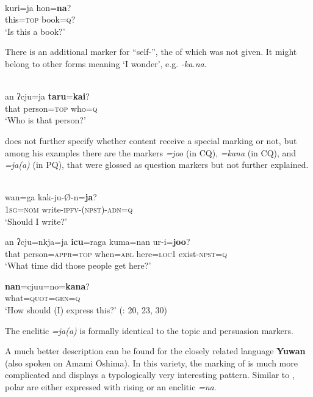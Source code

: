 \ea%
    \label{ex:japa:15}
    \\
    \gll kuri=ja  hon=\textbf{{na}}?\\
    this=\textsc{top}  book=\textsc{q}?\\
    \glt ‘Is this a book?’ \citep[27]{Shigeno2010}
    \z

There is an additional marker for “self-”, the  of which was not given. It might belong to other forms meaning ‘I wonder’, e.g.  \textit{-ka.na}.

\ea%
    \label{ex:japa:16}
    \\
    \gll an  ʔcju=ja \textbf{{taru}}{=}\textbf{{kai}}?\\
    that  person=\textsc{top}  who=\textsc{q}\\
    \glt ‘Who is that person?’ \citep[27]{Shigeno2010}
    \z

\citet{Shigeno2010} does not further specify whether content  receive a special marking or not, but among his examples there are the markers \textit{=joo} (in CQ), \textit{=kana} (in CQ), and \textit{=ja(a)} (in PQ), that were glossed as question markers but not further explained.

\ea%
    \label{ex:japa:17}
    \\
    \ea
    \gll wan=ga kak-ju-Ø-n=\textbf{{ja}}?\\
    1\textsc{sg}=\textsc{nom}  write-\textsc{ipfv}-(\textsc{npst})-\textsc{adn}=\textsc{q}\\
    \glt ‘Should I write?’
    
    \ex
    \gll an ʔcju=nkja=ja \textbf{{icu}}{=raga} kuma=nan ur-i=\textbf{{joo}}?\\
    that  person=\textsc{appr}=\textsc{top}  when=\textsc{abl}  here=\textsc{loc}1  exist-\textsc{npst}=\textsc{q}\\
    \glt ‘What time did those people get here?’
    
    \ex
    \gll \textbf{{nan}}=cjuu=no=\textbf{{kana}}?\\
    what=\textsc{quo}\textsc{t}=\textsc{gen}=\textsc{q}\\
    \glt ‘How should (I) express this?’ (\citealt{Shigeno2010}: 20, 23, 30)
    \z
    \z 

\noindent The enclitic \textit{=ja(a)} is formally identical to the topic and persuasion markers.

A much better description can be found for the closely related language \textbf{Yuwan} (also spoken on Amami \=Oshima). In this variety, the marking of  is much more complicated and displays a typologically very interesting pattern. Similar to , polar  are either expressed with rising  or an enclitic \textit{=na}.

